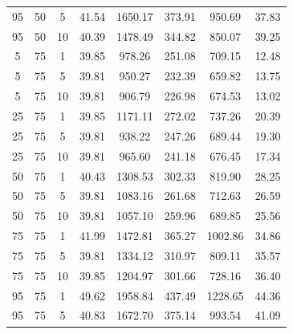 \begin{table}[H]
\begin{tabular}{ccc|c|c|c|c|c}
95 & 50 & 5 & \cellcolor{gray!63}41.54 & \cellcolor{gray!1}1650.17 & \cellcolor{gray!1}373.91 & \cellcolor{gray!1}950.69 & 37.83\\
95 & 50 & 10 & \cellcolor{gray!75}40.39 & \cellcolor{gray!1}1478.49 & \cellcolor{gray!1}344.82 & \cellcolor{gray!22}850.07 & 39.25\\
5 & 75 & 1 & \cellcolor{gray!80}39.85 & \cellcolor{gray!38}978.26 & \cellcolor{gray!11}251.08 & \cellcolor{gray!65}709.15 & 12.48\\
5 & 75 & 5 & \cellcolor{gray!80}39.81 & \cellcolor{gray!43}950.27 & \cellcolor{gray!28}232.39 & \cellcolor{gray!80}659.82 & 13.75\\
5 & 75 & 10 & \cellcolor{gray!80}39.81 & \cellcolor{gray!50}906.79 & \cellcolor{gray!33}226.98 & \cellcolor{gray!76}674.53 & 13.02\\
25 & 75 & 1 & \cellcolor{gray!80}39.85 & \cellcolor{gray!6}1171.11 & \cellcolor{gray!1}272.02 & \cellcolor{gray!57}737.26 & 20.39\\
25 & 75 & 5 & \cellcolor{gray!80}39.81 & \cellcolor{gray!45}938.22 & \cellcolor{gray!15}247.26 & \cellcolor{gray!71}689.44 & 19.30\\
25 & 75 & 10 & \cellcolor{gray!80}39.81 & \cellcolor{gray!40}965.60 & \cellcolor{gray!20}241.18 & \cellcolor{gray!75}676.45 & 17.34\\
50 & 75 & 1 & \cellcolor{gray!74}40.43 & \cellcolor{gray!1}1308.53 & \cellcolor{gray!1}302.33 & \cellcolor{gray!31}819.90 & 28.25\\
50 & 75 & 5 & \cellcolor{gray!80}39.81 & \cellcolor{gray!21}1083.16 & \cellcolor{gray!1}261.68 & \cellcolor{gray!64}712.63 & 26.59\\
50 & 75 & 10 & \cellcolor{gray!80}39.81 & \cellcolor{gray!25}1057.10 & \cellcolor{gray!3}259.96 & \cellcolor{gray!71}689.85 & 25.56\\
75 & 75 & 1 & \cellcolor{gray!58}41.99 & \cellcolor{gray!1}1472.81 & \cellcolor{gray!1}365.27 & \cellcolor{gray!1}1002.86 & 34.86\\
75 & 75 & 5 & \cellcolor{gray!80}39.81 & \cellcolor{gray!1}1334.12 & \cellcolor{gray!1}310.97 & \cellcolor{gray!35}809.11 & 35.57\\
75 & 75 & 10 & \cellcolor{gray!80}39.85 & \cellcolor{gray!1}1204.97 & \cellcolor{gray!1}301.66 & \cellcolor{gray!59}728.16 & 36.40\\
95 & 75 & 1 & \cellcolor{gray!1}49.62 & \cellcolor{gray!1}1958.84 & \cellcolor{gray!1}437.49 & \cellcolor{gray!1}1228.65 & 44.36\\
95 & 75 & 5 & \cellcolor{gray!70}40.83 & \cellcolor{gray!1}1672.70 & \cellcolor{gray!1}375.14 & \cellcolor{gray!1}993.54 & 41.09\\

\end{tabular}
\end{table}
